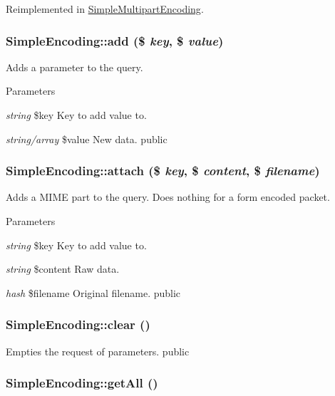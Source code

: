 Reimplemented in \hyperlink{class_simple_multipart_encoding_abaf98447496b4c38e470684da14e9ef5}{SimpleMultipartEncoding}.\hypertarget{class_simple_encoding_adb82dd33e86e00ef7a8a480536747eb5}{
\subsubsection[{add}]{\setlength{\rightskip}{0pt plus 5cm}SimpleEncoding::add (\$ {\em key}, \/  \$ {\em value})}}
\label{class_simple_encoding_adb82dd33e86e00ef7a8a480536747eb5}
Adds a parameter to the query. 
\begin{DoxyParams}{Parameters}
\item[{\em string}]\$key Key to add value to. \item[{\em string/array}]\$value New data.  public \end{DoxyParams}
\hypertarget{class_simple_encoding_a68a928475be4816c7f6a57cb47dc0c28}{
\subsubsection[{attach}]{\setlength{\rightskip}{0pt plus 5cm}SimpleEncoding::attach (\$ {\em key}, \/  \$ {\em content}, \/  \$ {\em filename})}}
\label{class_simple_encoding_a68a928475be4816c7f6a57cb47dc0c28}
Adds a MIME part to the query. Does nothing for a form encoded packet. 
\begin{DoxyParams}{Parameters}
\item[{\em string}]\$key Key to add value to. \item[{\em string}]\$content Raw data. \item[{\em hash}]\$filename Original filename.  public \end{DoxyParams}
\hypertarget{class_simple_encoding_a3c97df2ac54fe15a084e3742876f21fd}{
\subsubsection[{clear}]{\setlength{\rightskip}{0pt plus 5cm}SimpleEncoding::clear ()}}
\label{class_simple_encoding_a3c97df2ac54fe15a084e3742876f21fd}
Empties the request of parameters.  public \hypertarget{class_simple_encoding_a13d2399adeb9e4c0eb44865c1a36400b}{
\subsubsection[{getAll}]{\setlength{\rightskip}{0pt plus 5cm}SimpleEncoding::getAll ()}}
